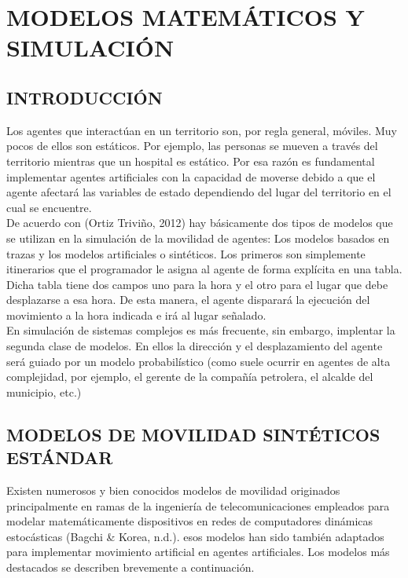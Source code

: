 \chapter{MODELOS MATEMÁTICOS Y SIMULACIÓN}

\renewcommand{\thefootnote}{\arabic{footnote}}
\renewcommand{\theequation}{\arabic{chapter}-\arabic{equation}}
\renewcommand{\thefigure}{\arabic{chapter}.\arabic{figure}}
\renewcommand{\figurename}{Figura}
\renewcommand{\tablename}{\textbf{Tabla}}
\renewcommand{\thetable}{\textbf{\arabic{chapter}-\arabic{table}}}
\providecommand{\abs}[1]{\lvert#1\rvert}
\providecommand{\norm}[1]{\lVert#1\rVert}
\newpage

\section{INTRODUCCIÓN}\label{sec:intro}
Los agentes que interactúan en un territorio son, por regla general, móviles. Muy pocos de ellos son estáticos.  Por ejemplo, las personas se mueven a través del territorio mientras que un hospital es estático. Por esa razón es fundamental implementar agentes artificiales con la capacidad de moverse debido a que el agente afectará las variables de estado dependiendo del lugar del territorio en el cual se encuentre. \\
De acuerdo con (Ortiz Triviño, 2012) hay básicamente dos tipos de modelos que se utilizan en la simulación de la movilidad de agentes: Los modelos basados en trazas y los modelos artificiales o sintéticos. Los primeros son simplemente itinerarios que el programador le asigna al agente de forma explícita en una tabla.   Dicha tabla tiene dos campos uno para la hora y el otro para el lugar que debe desplazarse a esa hora.  De esta manera, el agente disparará la ejecución del movimiento a la hora indicada e irá al lugar señalado.\\
En simulación de sistemas complejos es más frecuente, sin embargo, implentar la segunda clase  de modelos.  En ellos la dirección y el desplazamiento del agente será guiado por un modelo probabilístico (como suele ocurrir en agentes de alta complejidad, por ejemplo, el gerente de la compañía petrolera, el alcalde del municipio, etc.)
\section{MODELOS DE MOVILIDAD SINTÉTICOS\\ ESTÁNDAR}\label{sec:movilityModels}
Existen numerosos y bien conocidos modelos de movilidad originados principalmente en ramas de la ingeniería de telecomunicaciones empleados para modelar matemáticamente dispositivos en redes de computadores dinámicas estocásticas (Bagchi \& Korea, n.d.).  esos modelos han sido también adaptados para implementar movimiento artificial en agentes artificiales.  Los modelos más destacados se describen brevemente a continuación. 

